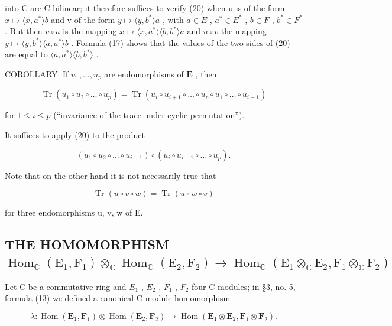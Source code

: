 into C are C-bilinear; it therefore suffices to verify (20) when u is of the form \(x \mapsto \langle x, a^{*} \rangle b\) and v of the form \(y \mapsto \langle y, b^{*} \rangle a\) , with \(a \in E\) , \(a^{*} \in E^{*}\) , \(b \in F\) , \(b^{*} \in F^{*}\) . But then \(v \circ u\) is the mapping \(x \mapsto \langle x, a^{*} \rangle \langle b, b^{*} \rangle a\) and \(u \circ v\) the mapping \(y \mapsto \langle y, b^{*} \rangle \langle a, a^{*} \rangle b\) . Formula (17) shows that the values of the two sides of (20) are equal to \(\langle a, a^{*} \rangle \langle b, b^{*} \rangle\) .

COROLLARY. If \(u_1, \ldots, u_p\) are endomorphisms of \(\mathbf{E}\) , then

\[
\operatorname{Tr} \left(u _ {1} \circ u _ {2} \circ \dots \circ u _ {p}\right) = \operatorname{Tr} \left(u _ {i} \circ u _ {i + 1} \circ \dots \circ u _ {p} \circ u _ {1} \circ \dots \circ u _ {i - 1}\right)
\]

for \(1 \leqslant i \leqslant p\) (``invariance of the trace under cyclic permutation'').

It suffices to apply (20) to the product

\[
\left(u _ {1} \circ u _ {2} \circ \dots \circ u _ {i - 1}\right) \circ \left(u _ {i} \circ u _ {i + 1} \circ \dots \circ u _ {p}\right).
\]

Note that on the other hand it is not necessarily true that

\[
\operatorname{Tr} (u \circ v \circ w) = \operatorname{Tr} (u \circ w \circ v)
\]

for three endomorphisms u, v, w of E.

\subsection{\texorpdfstring{THE HOMOMORPHISM \(\operatorname{Hom}_{\mathbb{C}}(\mathrm{E}_1, \mathrm{F}_1) \otimes_{\mathbb{C}} \operatorname{Hom}_{\mathbb{C}}(\mathrm{E}_2, \mathrm{F}_2) \to \operatorname{Hom}_{\mathbb{C}}(\mathrm{E}_1 \otimes_{\mathbb{C}} \mathrm{E}_2, \mathrm{F}_1 \otimes_{\mathbb{C}} \mathrm{F}_2)\)}{The homomorphism from Hom over C of E1,F1 tensor Hom over C of E2,F2 to Hom over C of the corresponding tensor products}}

Let C be a commutative ring and \(E_{1}\) , \(E_{2}\) , \(F_{1}\) , \(F_{2}\) four C-modules; in §3, no. 5, formula (13) we defined a canonical C-module homomorphism

\[
\lambda : \operatorname{Hom} (\mathbf {E} _ {1}, \mathbf {F} _ {1}) \otimes \operatorname{Hom} (\mathbf {E} _ {2}, \mathbf {F} _ {2}) \to \operatorname{Hom} (\mathbf {E} _ {1} \otimes \mathbf {E} _ {2}, \mathbf {F} _ {1} \otimes \mathbf {F} _ {2}). \tag {21}
\]

